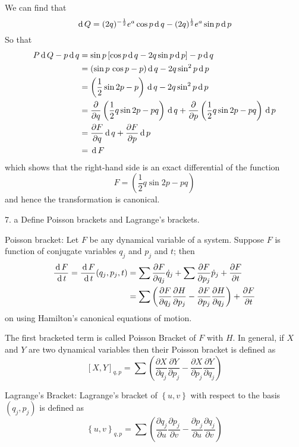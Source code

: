 \documentclass[12pt]{article}
\begin{document}
\begin{soln}
    We can find that
    \[\,\mathrm{d}\, Q=(2q)^{-\frac{1}{2}}e^a\cos p\,\mathrm{d}\, q-(2q)^{\frac{1}{2}}e^a\sin p\,\mathrm{d}\, p\]
    So that
    \begin{align*}
        P\,\mathrm{d}\, Q-p\,\mathrm{d}\, q&=\sin p\left[ \cos p \,\mathrm{d}\, q-2q \sin p \,\mathrm{d}\, p \right]-p\,\mathrm{d}\, q\\
        &=(\sin p \,\cos p-p)\,\mathrm{d}\, q-2q\sin^2 p\,\mathrm{d}\, p\\
        &=\left(\frac{1}{2}\sin 2p-p\right)\,\mathrm{d}\, q-2q\sin^2 p\,\mathrm{d}\, p\\
        &=\frac{\partial }{\partial q}\left(\frac{1}{2} q \sin 2p-pq\right)\,\mathrm{d}\, q+\frac{\partial }{\partial p}\left( \frac{1}{2}q\sin 2p-pq \right)\,\mathrm{d}\, p\\
        &=\frac{\partial F}{\partial q}\,\mathrm{d}\, q+\frac{\partial F}{\partial p}\,\mathrm{d}\, p\\
        &=\,\mathrm{d}\, F
    \end{align*}
    which shows that the right-hand side is an exact differential of the function
    \[F=\left(\frac{1}{2} q \sin 2p-pq\right)\]
    and hence the transformation is canonical.
\end{soln}
\begin{prob}{7. a}
    Define Poisson brackets and Lagrange's brackets.
\end{prob}
\begin{soln}
    Poisson bracket: Let \(F\) be any dynamical variable of a system. Suppose \(F\) is function of conjugate variables \(q_j\) and \(p_j\) and \(t\); then
    \begin{align*}
        \frac{\,\mathrm{d}\, F}{\,\mathrm{d}\, t}=\frac{\,\mathrm{d}\, F}{\,\mathrm{d}\, t}(q_j,p_j,t)&=\sum \frac{\partial F}{\partial q_j}\dot{q}_j+\sum \frac{\partial F}{\partial p_j}\dot{p}_j+\frac{\partial F}{\partial t}\\
        &=\sum\left( \frac{\partial F}{\partial q_j}\frac{\partial H}{\partial p_j}-\frac{\partial F}{\partial p_j} \frac{\partial H}{\partial q_j}\right)+\frac{\partial F}{\partial t}
    \end{align*}
    on using Hamilton's canonical equations of motion.

    The first bracketed term is called Poisson Bracket of \(F\) with \(H\). In general, if \(X\) and \(Y\) are two dynamical variables then their Poisson bracket is defined as
    \[[X,Y]_{q,p}=\sum\left( \frac{\partial X}{\partial q_j}\frac{\partial Y}{\partial p_j}-\frac{\partial X}{\partial p_j} \frac{\partial Y}{\partial q_j}\right)\]


    Lagrange's Bracket: Lagrange's bracket of \(\left\{ u,v \right\}\) with respect to the basis \((q_j,p_j)\) is defined as
    \[\left\{ u,v \right\}_{q,p}=\sum\left( \frac{\partial q_j}{\partial u}\frac{\partial p_j}{\partial v}-\frac{\partial p_j}{\partial u} \frac{\partial q_j}{\partial v}\right)\]
\end{soln}
\end{document}
